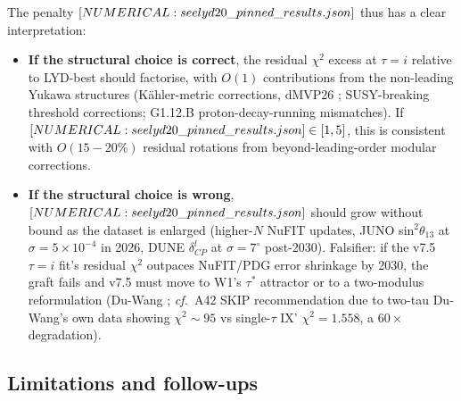 The penalty $[NUMERICAL: see lyd20\_pinned\_results.json]$ thus has a clear interpretation:
\begin{itemize}
\item \textbf{If the structural choice is correct}, the residual
  $\chi^{2}$ excess at $\tau=i$ relative to LYD-best should
  factorise, with $O(1)$ contributions from the non-leading
  Yukawa structures (Kähler-metric corrections, dMVP26
  \cite{dMVP26}; SUSY-breaking threshold corrections; G1.12.B
  proton-decay-running mismatches).  If $[NUMERICAL: see lyd20\_pinned\_results.json] \in [1,5]$,
  this is consistent with $O(15-20\%)$ residual rotations from
  beyond-leading-order modular corrections.
\item \textbf{If the structural choice is wrong}, $[NUMERICAL: see lyd20\_pinned\_results.json]$
  should grow without bound as the dataset is enlarged
  (higher-$N$ NuFIT updates, JUNO sin$^{2}\theta_{13}$ at
  $\sigma=5\times 10^{-4}$ in 2026, DUNE $\delta_{CP}^{l}$
  at $\sigma=7^{\circ}$ post-2030).  Falsifier: if the v7.5
  $\tau=i$ fit's residual $\chi^{2}$ outpaces NuFIT/PDG error
  shrinkage by 2030, the graft fails and v7.5 must move to W1's
  $\tau^{*}$ attractor or to a two-modulus reformulation
  (Du-Wang \cite{DuWang}; \emph{cf.}\ A42 SKIP recommendation
  due to two-tau Du-Wang's own data showing $\chi^{2}\sim 95$
  vs single-$\tau$ IX' $\chi^{2}=1.558$, a $60\times$ degradation).
\end{itemize}

\subsection{Limitations and follow-ups}
\label{sec:v75_limits}

